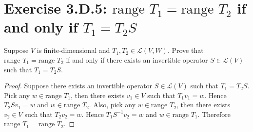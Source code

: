 \section{Exercise 3.D.5: $\text{range }T_1=\text{range }T_2$ if and only if $T_1=T_2S$}
\label{Exercise 3.D.5}
Suppose $V$ is finite-dimensional and $T_1,T_2\in\mathcal{L}(V,W)$. Prove that $\text{range }T_1=\text{range }T_2$ if and only if there exists an invertible operator $S\in\mathcal{L}(V)$ such that $T_1=T_2S$.
\begin{proof}
Suppose there exists an invertible operator $S\in\mathcal{L}(V)$ such that $T_1=T_2S$. Pick any $w\in\text{range }T_1$, then there exists $v_1\in V$ such that $T_1v_1=w$. Hence $T_2Sv_1=w$ and $w\in\text{range }T_2$. Also, pick any $w\in\text{range }T_2$, then there exists $v_2\in V$ such that $T_2v_2=w$. Hence $T_1S^{-1}v_2=w$ and $w\in\text{range }T_1$. Therefore $\text{range }T_1=\text{range }T_2$.


\end{proof}
